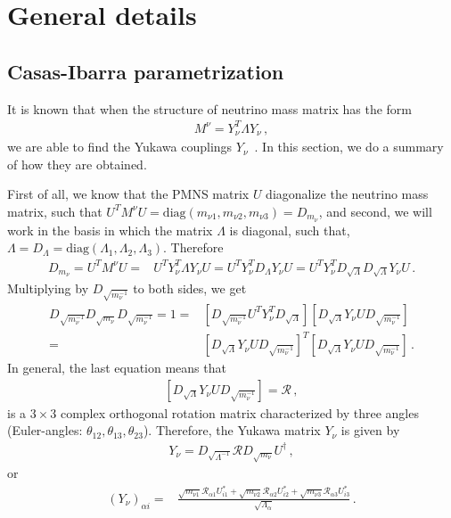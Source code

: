 \chapter{General details}

\section{Casas-Ibarra parametrization}
\label{sec:casas-ibarra}

It is known that when the structure of neutrino mass matrix has the form
%
\begin{align}
M^{\nu}=Y^{T}_{\nu}\Lambda Y_{\nu}  \,,
\end{align}
we are able to find the Yukawa couplings $Y_{\nu}$~\cite{Casas:2001sr,Ibarra:2003up}. 
In this section, we do a summary of how they are obtained.

First of all, we know that the PMNS matrix $U$ diagonalize the neutrino mass matrix, such that 
$U^T M^{\nu}U=\text{diag}(m_{\nu 1},m_{\nu 2},m_{\nu 3})=D_{m_\nu}$, and second, we will work in the basis in which the matrix $\Lambda$ is diagonal, such that, $\Lambda=D_{\Lambda}=\text{diag}(\Lambda_1,\Lambda_2,\Lambda_3)$. Therefore
%
\begin{align}
D_{m_\nu}=U^T M^{\nu}U=&U^TY_{\nu}^T\Lambda Y_{\nu}U = U^TY_{\nu}^TD_{\Lambda} Y_{\nu}U 
= U^TY_{\nu}^TD_{\sqrt{\Lambda}}D_{\sqrt{\Lambda}} Y_{\nu}U \,.
\end{align}
Multiplying by $D_{\sqrt{m_\nu^{-1}}}$ to both sides, we get
\begin{align}
D_{\sqrt{m_\nu^{-1}}}D_{\sqrt{m_\nu}}D_{\sqrt{m_\nu^{-1}}}= 1 =&
\left[D_{\sqrt{m_\nu^{-1}}}U^TY_{\nu}^TD_{\sqrt{\Lambda}}\right] \left[D_{\sqrt{\Lambda}} Y_{\nu}UD_{\sqrt{m_\nu^{-1}}}\right] \nonumber\\
=&\left[D_{\sqrt{\Lambda}} Y_{\nu} U D_{\sqrt{m_\nu^{-1}}}\right]^T \left[D_{\sqrt{\Lambda}} Y_{\nu}UD_{\sqrt{m_\nu^{-1}}}\right]\,.
\end{align}
In general, the last equation means that 
\begin{align}
\left[D_{\sqrt{\Lambda}} Y_{\nu}UD_{\sqrt{m_\nu^{-1}}}\right]=\mathcal{R}\,,
\end{align}
 is a $3\times 3$ complex orthogonal rotation matrix characterized by three angles (Euler-angles: $\theta_{12},\theta_{13},\theta_{23}$). Therefore, the Yukawa matrix $Y_{\nu}$ is given by
\begin{align}
Y_{\nu}=D_{\sqrt{\Lambda^{-1}}}\mathcal{R}D_{\sqrt{m_\nu}}U^{\dagger}\,,
\end{align} 
or 
\begin{align}
(Y_{\nu})_{ \alpha i}=&\frac{\sqrt{m_{\nu 1}}{\mathcal{R}}_{\alpha 1}U_{i1}^*+\sqrt{m_{\nu 2}}{\mathcal{R}}_{\alpha 2} U^{*}_{i2}+ \sqrt{m_{\nu 3}}{\mathcal{R}}_{\alpha 3} U^{*}_{i3}}{\sqrt{\Lambda_\alpha}}\,.
\end{align}

